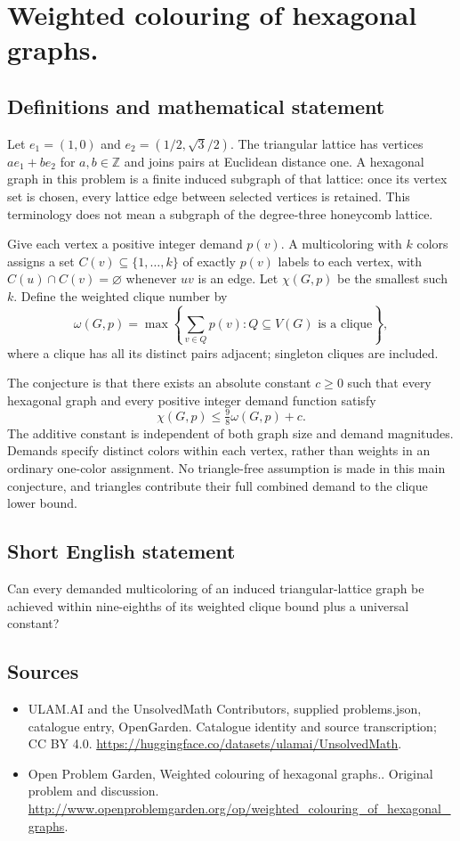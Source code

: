 \documentclass[11pt,a4paper]{article}
\begin{document}
\section*{Weighted colouring of hexagonal graphs.}\label{statement}

\subsection{Definitions and mathematical statement}
Let $e_1=(1,0)$ and $e_2=(1/2,\sqrt3/2)$. The triangular lattice has vertices $ae_1+be_2$ for $a,b\in\mathbb Z$ and joins pairs at Euclidean distance one. A hexagonal graph in this problem is a finite induced subgraph of that lattice: once its vertex set is chosen, every lattice edge between selected vertices is retained. This terminology does not mean a subgraph of the degree-three honeycomb lattice.

Give each vertex a positive integer demand $p(v)$. A multicoloring with $k$ colors assigns a set $C(v)\subseteq\{1,\ldots,k\}$ of exactly $p(v)$ labels to each vertex, with $C(u)\cap C(v)=\varnothing$ whenever $uv$ is an edge. Let $\chi(G,p)$ be the smallest such $k$. Define the weighted clique number by
\[
 \omega(G,p)=\max\left\{\sum_{v\in Q}p(v):Q\subseteq V(G)
                          \text{ is a clique}\right\},
\]
where a clique has all its distinct pairs adjacent; singleton cliques are included.

The conjecture is that there exists an absolute constant $c\ge0$ such that every hexagonal graph and every positive integer demand function satisfy
\[
                         \chi(G,p)\le\tfrac98\omega(G,p)+c.
\]
The additive constant is independent of both graph size and demand magnitudes. Demands specify distinct colors within each vertex, rather than weights in an ordinary one-color assignment. No triangle-free assumption is made in this main conjecture, and triangles contribute their full combined demand to the clique lower bound.
\subsection{Short English statement}
Can every demanded multicoloring of an induced triangular-lattice graph be achieved within nine-eighths of its weighted clique bound plus a universal constant?
\subsection{Sources}
\begin{itemize}
\item[S1] ULAM.AI and the UnsolvedMath Contributors, supplied problems.json, catalogue entry, OpenGarden. Catalogue identity and source transcription; CC BY 4.0.
\url{https://huggingface.co/datasets/ulamai/UnsolvedMath}.
\item[S2] Open Problem Garden, Weighted colouring of hexagonal graphs.. Original problem and discussion.
\url{http://www.openproblemgarden.org/op/weighted_colouring_of_hexagonal_graphs}.
\end{itemize}
\end{document}
